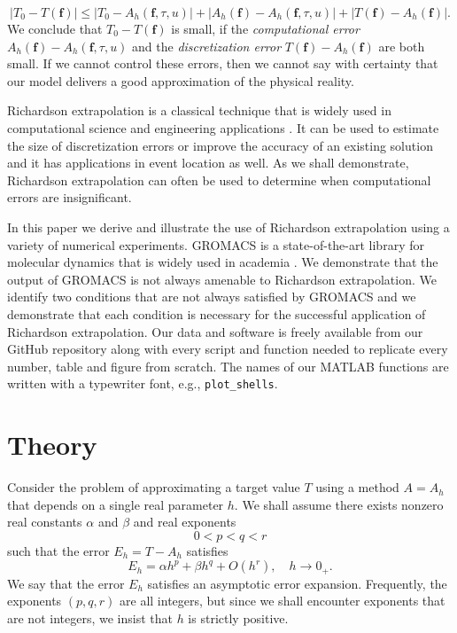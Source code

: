 \documentclass[runningheads]{llncs}
\begin{document}
\begin{equation}
  |T_0 - T(\bm{f}) | \leq  |T_0 - A_h(\bm{f},\tau,u)| + |A_h(\bm{f}) - A_h(\bm{f},\tau,u)| + |T(\bm{f}) - A_h(\bm{f})|.
\end{equation}
We conclude that $T_0 - T(\bm{f})$ is small, if the \emph{computational error} $A_h(\bm{f}) - A_h(\bm{f}, \tau, u)$ and the \emph{discretization error} $T(\bm{f}) - A_h(\bm{f})$ are both small. If we cannot control these errors, then we cannot say with certainty that our model delivers a good approximation of the physical reality.

Richardson extrapolation is a classical technique that is widely used in computational science and engineering applications \cite{roache1998}. It can be used to estimate the size of discretization errors or improve the accuracy of an existing solution \cite{zahari2018} and it has applications in event location \cite{mannshardt1978one} as well. As we shall demonstrate, Richardson extrapolation can often be used to determine when computational errors are insignificant.

In this paper we derive and illustrate the use of Richardson extrapolation using a variety of numerical experiments.
GROMACS is a state-of-the-art library for molecular dynamics that is widely used in academia \cite{gromacs2005}.
We demonstrate that the output of GROMACS is not always amenable to Richardson extrapolation. 
We identify two conditions that are not always satisfied by GROMACS and we demonstrate that each condition is necessary for the successful application of Richardson extrapolation.
Our data and software is freely available from our GitHub \cite{spockcc2024ppam} repository along with every script and function needed to replicate every number, table and figure from scratch. The names of our MATLAB functions are written with a typewriter font, e.g., \texttt{plot\_shells}.

\section{Theory}

Consider the problem of approximating a target value $T$ using a method $A = A_h$ that depends on a single real parameter $h$. We shall assume there exists nonzero real constants $\alpha$ and $\beta$ and real exponents
\begin{equation}
  0 < p < q < r
\end{equation}
such that the error $E_h = T - A_h$ satisfies
\begin{equation} \label{equ:aex}
  E_h  = \alpha h^p + \beta h^q + O(h^r), \quad h \rightarrow 0_+.
\end{equation}
We say that the error $E_h$ satisfies an asymptotic error expansion. Frequently, the exponents $(p,q,r)$ are all integers, but since we shall encounter exponents that are not integers, we insist that $h$ is strictly positive.
\end{document}
